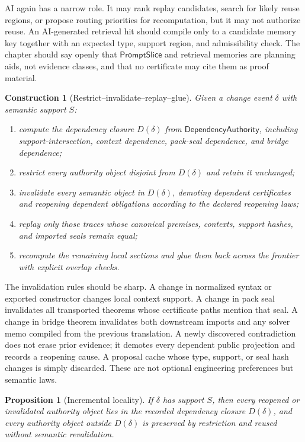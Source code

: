 \documentclass[11pt]{report}
\newtheorem{proposition}[definition]{Proposition}
\newtheorem{construction}[definition]{Construction}
\begin{document}
AI again has a narrow role. It may rank replay candidates, search for likely reuse regions, or propose routing priorities for recomputation, but it may not authorize reuse. An AI-generated retrieval hit should compile only to a candidate memory key together with an expected type, support region, and admissibility check. The chapter should say openly that $\mathsf{PromptSlice}$ and retrieval memories are planning aids, not evidence classes, and that no certificate may cite them as proof material.

\begin{construction}[Restrict--invalidate--replay--glue]
Given a change event $\delta$ with semantic support $S$:
\begin{enumerate}
\item compute the dependency closure $D(\delta)$ from $\mathsf{DependencyAuthority}$, including support-intersection, context dependence, pack-seal dependence, and bridge dependence;
\item restrict every authority object disjoint from $D(\delta)$ and retain it unchanged;
\item invalidate every semantic object in $D(\delta)$, demoting dependent certificates and reopening dependent obligations according to the declared reopening laws;
\item replay only those traces whose canonical premises, contexts, support hashes, and imported seals remain equal;
\item recompute the remaining local sections and glue them back across the frontier with explicit overlap checks.
\end{enumerate}
\end{construction}

The invalidation rules should be sharp. A change in normalized syntax or exported constructor changes local context support. A change in pack seal invalidates all transported theorems whose certificate paths mention that seal. A change in bridge theorem invalidates both downstream imports and any solver memo compiled from the previous translation. A newly discovered contradiction does not erase prior evidence; it demotes every dependent public projection and records a reopening cause. A proposal cache whose type, support, or seal hash changes is simply discarded. These are not optional engineering preferences but semantic laws.

\begin{proposition}[Incremental locality]
If $\delta$ has support $S$, then every reopened or invalidated authority object lies in the recorded dependency closure $D(\delta)$, and every authority object outside $D(\delta)$ is preserved by restriction and reused without semantic revalidation.
\end{proposition}
\end{document}
